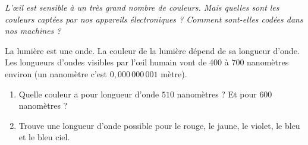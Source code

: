 \documentclass[class=report,crop=false, 12pt]{standalone}
\begin{document}
\newcommand{\hexa}{\text{hex}}



\emph{L'œil est sensible à un très grand nombre de couleurs. Mais quelles sont les couleurs captées par nos appareils électroniques ? Comment sont-elles codées dans nos machines ?}

\bigskip
\bigskip


\begin{activite}

%


La lumière est une onde. La couleur de la lumière dépend de 
sa longueur d'onde. Les longueurs d'ondes visibles par l'\oe il humain  vont de $400$ à $700$ nanomètres environ (un nanomètre c'est $0,000 \, 000 \,001$ mètre).


  \begin{enumerate}
    \item Quelle couleur a pour longueur d'onde $510$ nanomètres ? Et pour $600$ nanomètres ?
    
    \item Trouve une longueur d'onde possible pour le rouge, le jaune, le violet, le bleu et le bleu ciel.
    
  \end{enumerate}
  
%  
%  


\end{activite}
\end{document}

